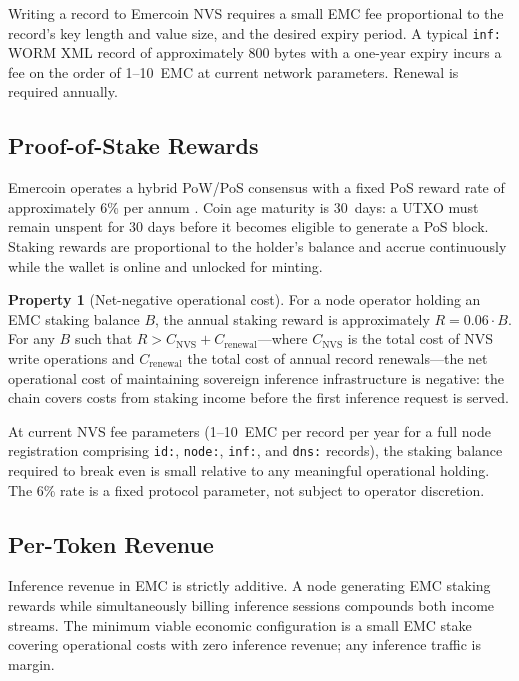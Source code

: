 \documentclass[11pt,a4paper]{article}
\theoremstyle{definition}
\newtheorem{property}{Property}[section]
\begin{document}
Writing a record to Emercoin NVS requires a small EMC fee proportional to
the record's key length and value size, and the desired expiry period.  A
typical \texttt{inf:} WORM XML record of approximately 800 bytes with a
one-year expiry incurs a fee on the order of 1--10~EMC at current network
parameters.  Renewal is required annually.

\subsection{Proof-of-Stake Rewards}

Emercoin operates a hybrid PoW/PoS consensus with a fixed PoS reward rate
of approximately 6\% per annum \cite{emercoin}.  Coin age maturity is 30~days:
a UTXO must remain unspent for 30 days before it becomes eligible to generate
a PoS block.  Staking rewards are proportional to the holder's balance and
accrue continuously while the wallet is online and unlocked for minting.

\begin{property}[Net-negative operational cost]
For a node operator holding an EMC staking balance $B$, the annual staking
reward is approximately $R = 0.06 \cdot B$.  For any $B$ such that
$R > C_{\mathrm{NVS}} + C_{\mathrm{renewal}}$---where $C_{\mathrm{NVS}}$
is the total cost of NVS write operations and $C_{\mathrm{renewal}}$
the total cost of annual record renewals---the net operational cost of
maintaining sovereign inference infrastructure is negative: the chain
covers costs from staking income before the first inference request is
served.
\end{property}

At current NVS fee parameters (1--10~EMC per record per year for a full
node registration comprising \texttt{id:}, \texttt{node:}, \texttt{inf:},
and \texttt{dns:} records), the staking balance required to break even
is small relative to any meaningful operational holding.  The 6\% rate
is a fixed protocol parameter, not subject to operator discretion.

\subsection{Per-Token Revenue}

Inference revenue in EMC is strictly additive.  A node generating EMC
staking rewards while simultaneously billing inference sessions compounds
both income streams.  The minimum viable economic configuration is a
small EMC stake covering operational costs with zero inference revenue;
any inference traffic is margin.
\end{document}
